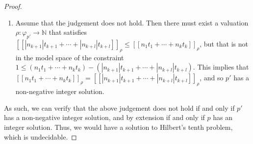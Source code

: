 \begin{lemma}
\begin{proof}
\begin{enumerate}
    \item Assume that the judgement does not hold. Then there must exist a valuation $\rho : \varphi_{p'} \longrightarrow \mathbb{N}$ that satisfies $[\![|n_{k+1}| t_{k+1} + \cdots + |n_{k+l}| t_{k+l}]\!]_\rho \leq [\![n_1 t_1 + \cdots + n_k t_k]\!]_\rho$, but that is not in the model space of the constraint $1 \leq (n_1 t_1 + \cdots + n_k t_k) - (|n_{k+1}| t_{k+1} + \cdots + |n_{k+l}| t_{k+l})$. This implies that $[\![n_1 t_1 + \cdots + n_k t_k]\!]_\rho = [\![|n_{k+1}| t_{k+1} + \cdots + |n_{k+l}| t_{k+l}]\!]_\rho$, and so $p'$ has a non-negative integer solution.
\end{enumerate}
As such, we can verify that the above judgement does not hold if and only if $p'$ has a non-negative integer solution, and by extension if and only if $p$ has an integer solution. Thus, we would have a solution to Hilbert's tenth problem, which is undecidable.
\end{proof}
\end{lemma}

